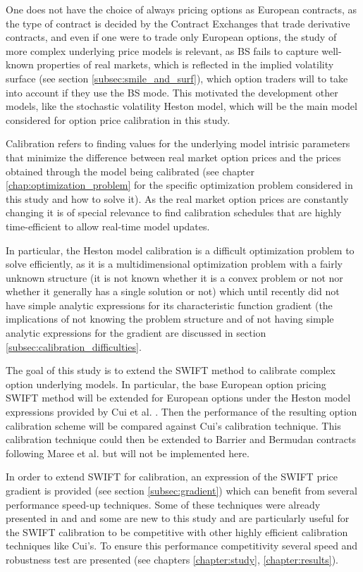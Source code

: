 \documentclass[12,twoside]{mammeTFM}
\theoremstyle{definition}
\theoremstyle{remark}
\begin{document}
One does not have the choice of always pricing options as European contracts, as the type of contract is decided by the Contract Exchanges that trade derivative contracts, and even if one were to trade only European options, the study of more complex underlying price models is relevant, as BS fails to capture well-known properties of real markets, which is reflected in the implied volatility surface (see section \ref{subsec:smile_and_surf}), which option traders will to take into account if they use the BS mode. This motivated the development other models, like the stochastic volatility Heston model, which will be the main model considered for option price calibration in this study.

Calibration refers to finding values for the underlying model intrisic parameters that minimize the difference between real market option prices and the prices obtained through the model being calibrated (see chapter \ref{chap:optimization_problem} for the specific optimization problem considered in this study and how to solve it). As the real market option prices are constantly changing it is of special relevance to find calibration schedules that are highly time-efficient to allow real-time model updates.

In particular, the Heston model calibration is a difficult optimization problem to solve efficiently, as it is a multidimensional optimization problem with a fairly unknown structure (it is not known whether it is a convex problem or not nor whether it generally has a single solution or not) which until recently did not have simple analytic expressions for its characteristic function gradient \cite{cui17} (the implications of not knowing the problem structure and of not having simple analytic expressions for the gradient are discussed in section \ref{subsec:calibration_difficulties}.

The goal of this study is to extend the SWIFT method to calibrate complex option underlying models. In particular, the base European option pricing SWIFT method will be extended for European options under the Heston model expressions provided by Cui et al. \cite{cui17}. Then the performance of the resulting option calibration scheme will be compared against Cui's calibration technique. This calibration technique could then be extended to Barrier and Bermudan contracts following Maree et al. \cite{mar17} but will not be implemented here.

In order to extend SWIFT for calibration, an expression of the SWIFT price gradient is provided (see section \ref{subsec:gradient}) which can benefit from several performance speed-up techniques. Some of these techniques were already presented in \cite{Ortiz-Gracia2016} and \cite{mar17} and some are new to this study and are particularly useful for the SWIFT calibration to be competitive with other highly efficient calibration techniques like Cui's. To ensure this performance competitivity several speed and robustness test are presented (see chapters \ref{chapter:study}, \ref{chapter:results}).
\end{document}

